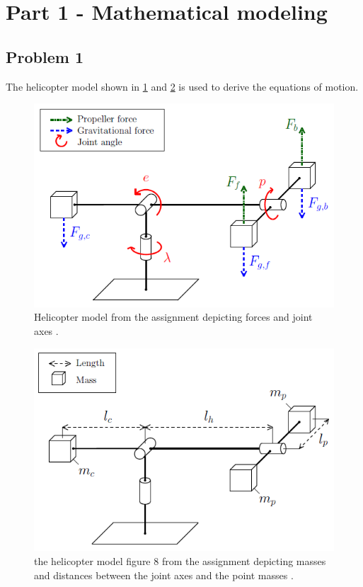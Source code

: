 
\section{Part 1 - Mathematical modeling}
\subsection{Problem 1}
\label{subsec:problem 1}
%
The helicopter model shown in \cref{fig:helicopter_model_forces} and
\cref{fig:helicopter_model_masses} is used to derive the equations of motion.
%
\begin{figure}[hbp]
  \caption{Helicopter model from the assignment depicting
    forces and joint axes \cite[p.12]{assignment}.}
  \label{fig:helicopter_model_forces}
  \includegraphics[width=\textwidth]{images/helicopter_model_forces}
\end{figure}
%
\begin{figure}[H]
  \caption{the helicopter model figure 8 from the assignment depicting
    masses and distances between the joint axes and the point masses
    \cite[p.13]{assignment}.}
  \label{fig:helicopter_model_masses}
  \includegraphics[width=\textwidth]{images/helicopter_model_masses}
\end{figure}
